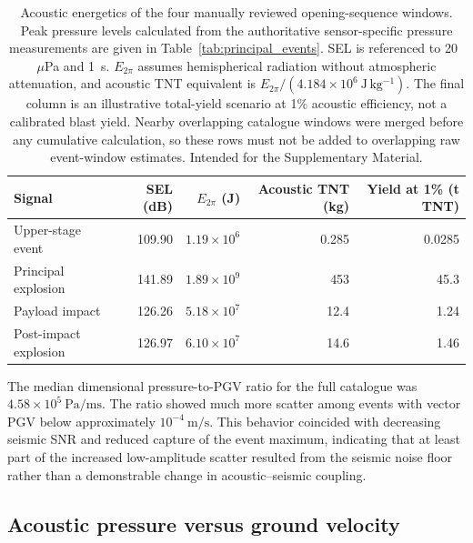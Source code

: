 \documentclass[]{seismica}
\begin{document}

\begin{table}[t]
\caption{Acoustic energetics of the four manually reviewed opening-sequence
windows. Peak pressure levels calculated from the authoritative
sensor-specific pressure measurements are given in
Table~\ref{tab:principal_events}. SEL is referenced to 20~$\mu$Pa and 1~s.
$E_{2\pi}$ assumes hemispherical radiation without atmospheric attenuation,
and acoustic TNT equivalent is
$E_{2\pi}/(4.184\times10^6~\mathrm{J\,kg^{-1}})$. The final column is an
illustrative total-yield scenario at 1\% acoustic efficiency, not a calibrated
blast yield. Nearby overlapping catalogue windows were merged before any
cumulative calculation, so these rows must not be added to overlapping raw
event-window estimates. Intended for the Supplementary Material.}
\label{tab:named_energetics}
\centering
\small
\begin{tabular}{lrrrr}
\hline
Signal & SEL (dB) & $E_{2\pi}$ (J) & Acoustic TNT (kg) & Yield at 1\% (t TNT) \\
\hline
Upper-stage event & 109.90 & $1.19\times10^6$ & 0.285 & 0.0285 \\
Principal explosion & 141.89 & $1.89\times10^9$ & 453 & 45.3 \\
Payload impact & 126.26 & $5.18\times10^7$ & 12.4 & 1.24 \\
Post-impact explosion & 126.97 & $6.10\times10^7$ & 14.6 & 1.46 \\
\hline
\end{tabular}
\end{table}

The median dimensional pressure-to-PGV ratio for the full catalogue was
$4.58\times10^{5}\ \si{\pascal\per\metre\second}$. The ratio showed much more
scatter among events with vector PGV below approximately
$10^{-4}\ \si{\metre\per\second}$. This behavior coincided with decreasing
seismic SNR and reduced capture of the event maximum, indicating that at least
part of the increased low-amplitude scatter resulted from the seismic noise
floor rather than a demonstrable change in acoustic--seismic coupling.


\subsection{Acoustic pressure versus ground velocity}
\label{sec:results_regression}
\end{document}
